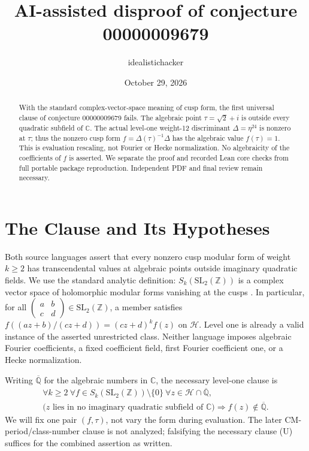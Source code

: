 \documentclass[11pt]{article}
\title{AI-assisted disproof of conjecture 00000009679}
\author{idealistichacker}
\date{October 29, 2026}
\newcommand{\Q}{\mathbb Q}
\newcommand{\C}{\mathbb C}
\newcommand{\Hh}{\mathcal H}
\newcommand{\SL}{\mathrm{SL}_2(\mathbb Z)}
\begin{document}
\maketitle
\begin{abstract}
With the standard complex-vector-space meaning of cusp form, the first
universal clause of conjecture 00000009679 fails. The algebraic point
$\tau=\sqrt2+i$ is outside every quadratic subfield of $\C$. The actual
level-one weight-12 discriminant $\Delta=\eta^{24}$ is nonzero at $\tau$;
thus the nonzero cusp form $f=\Delta(\tau)^{-1}\Delta$ has the algebraic
value $f(\tau)=1$. This is evaluation rescaling, not Fourier or Hecke
normalization. No algebraicity of the coefficients of $f$ is asserted.
We separate the proof and recorded Lean core checks from full portable
package reproduction. Independent PDF and final review remain necessary.
\end{abstract}
\section{The Clause and Its Hypotheses}
Both source languages assert that every nonzero cusp modular form of
weight $k\geq2$ has transcendental values at algebraic points outside
imaginary quadratic fields. We use the standard analytic definition:
$S_k(\SL)$ is a complex vector space of holomorphic modular forms
vanishing at the cusps \cite[Definition 4.5, p.~49]{Milne}.
In particular, for all $\left(\begin{smallmatrix}a&b\\c&d\end{smallmatrix}\right)
\in\SL$, a member satisfies
$f((az+b)/(cz+d))=(cz+d)^k f(z)$ on $\Hh$.
Level one is already a valid instance of the asserted unrestricted class.
Neither language imposes algebraic Fourier coefficients, a fixed
coefficient field, first Fourier coefficient one, or a Hecke normalization.

Writing $\overline{\Q}$ for the algebraic numbers in $\C$, the necessary
level-one clause is
\[
 \begin{gathered}
 \forall k\geq2\ \forall f\in S_k(\SL)\setminus\{0\}\
 \forall z\in\Hh\cap\overline{\Q},\\
 \bigl(z\text{ lies in no imaginary quadratic subfield of }\C\bigr)
 \Longrightarrow f(z)\notin\overline{\Q}.
 \end{gathered}
\tag{U}
\]
We will fix one pair $(f,\tau)$, not vary the form during evaluation.
The later CM-period/class-number clause is not analyzed; falsifying the
necessary clause (U) suffices for the combined assertion as written.
\end{document}
